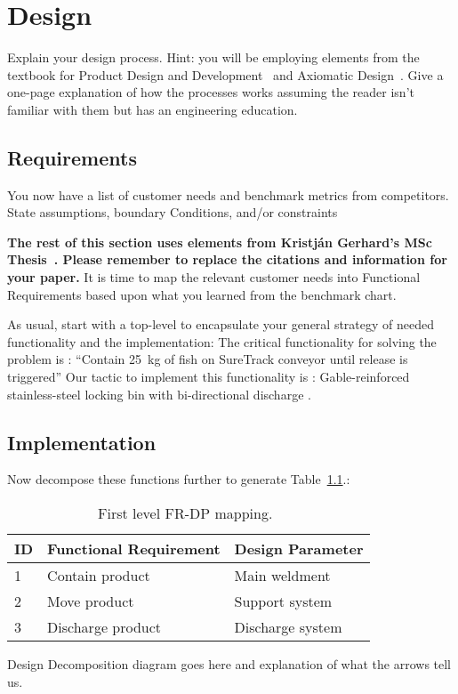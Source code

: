 \chapter{Design\label{cha:design}}
Explain your design process.
Hint:  you will be employing elements from the textbook for Product Design and Development~\cite{ulrich2020product-design-development} and Axiomatic Design~\cite{suh2021des}.
Give a one-page explanation of how the processes works assuming the reader isn't familiar with them but has an engineering education.


\section{Requirements}
You now have a list of customer needs and benchmark metrics from competitors.
State assumptions, boundary Conditions, and/or constraints

\textbf{The rest of this section uses elements from Kristján Gerhard's MSc Thesis~\cite{gerhard2016suretrack}.
Please remember to replace the citations and information for your paper.}
It is time to map the relevant customer needs into Functional Requirements based upon what you learned from the benchmark chart.

As usual, start with a top-level to encapsulate your general strategy of needed functionality and the implementation:
The critical functionality for solving the problem is  : ``Contain \SI{25}{\kilogram} of fish on SureTrack conveyor until release is triggered''
Our tactic to implement this functionality is : Gable-reinforced stainless-steel locking bin with bi-directional discharge
\cite{gerhard2016suretrack}.


\section{Implementation}
Now decompose these functions further to generate Table~\ref{tab:first_level-frdp}.:
\begin{table}
  \center
  \caption{First level FR-DP mapping.~\cite{gerhard2016suretrack}}\label{tab:first_level-frdp}
  \begin{tabular}{lll} \toprule
    ID& Functional Requirement & Design Parameter \\ \midrule 
    1&Contain product&Main weldment\\
    2&Move product&Support system\\
    3&Discharge product &Discharge system\\
    \bottomrule
  \end{tabular}
\end{table}
Design Decomposition diagram goes here and explanation of what the arrows tell us.

